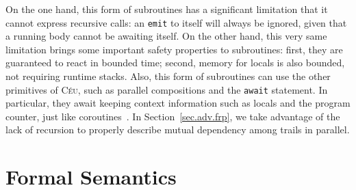 \documentclass{sigplanconf}
\newcommand{\CEU}{\textsc{C\'{e}u}\xspace}
\newcommand{\code}[1] {{\small{\texttt{#1}}}}
\newcommand{\1}{\;}
\newcommand{\2}{\;\;}
\newcommand{\3}{\;\;\;}
\newcommand{\5}{\;\;\;\;\;}
\begin{document}
On the one hand, this form of subroutines has a significant limitation that it 
cannot express recursive calls: an \code{emit} to itself will always be 
ignored, given that a running body cannot be awaiting itself.
%
On the other hand, this very same limitation brings some important safety 
properties to subroutines:
first, they are guaranteed to react in bounded time;
second, memory for locals is also bounded, not requiring runtime stacks.
%
Also, this form of subroutines can use the other primitives of \CEU, such as 
parallel compositions and the \code{await} statement.
In particular, they await keeping context information such as locals and the 
program counter, just like coroutines~\cite{lua.coroutines}.
%
In Section~\ref{sec.adv.frp}, we take advantage of the lack of recursion to 
properly describe mutual dependency among trails in parallel.

\section{Formal Semantics}

\end{document}
